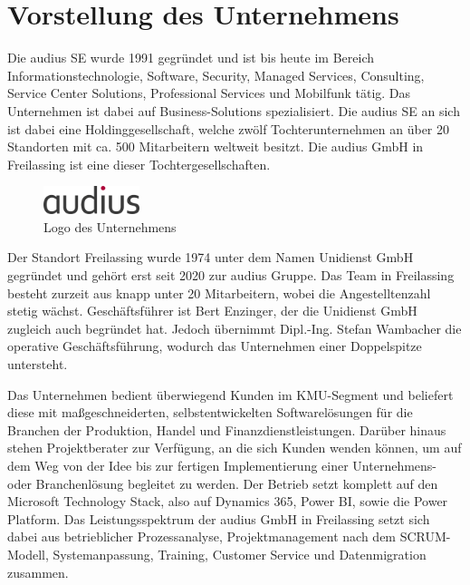 \section{Vorstellung des Unternehmens}
\label{sec:vorstellungunternehmen}

Die audius SE wurde 1991 gegründet und ist bis heute im Bereich Informationstechnologie, Software, Security, Managed Services, Consulting, Service Center Solutions, Professional Services und Mobilfunk tätig. Das Unternehmen ist dabei auf Business-Solutions spezialisiert. Die audius SE an sich ist dabei eine Holdinggesellschaft, welche zwölf Tochterunternehmen an über 20 Standorten mit ca. 500 Mitarbeitern weltweit besitzt. Die audius GmbH in Freilassing ist eine dieser Tochtergesellschaften.

\begin{figure}[h]
    \centering
    \includegraphics[width=0.25\textwidth]{img/audius_logo.png}
    \caption{Logo des Unternehmens}
\end{figure}

Der Standort Freilassing wurde 1974 unter dem Namen Unidienst GmbH gegründet und gehört erst seit 2020 zur audius Gruppe. Das Team in Freilassing besteht zurzeit aus knapp unter 20 Mitarbeitern, wobei die Angestelltenzahl stetig wächst. Geschäftsführer ist Bert Enzinger, der die Unidienst GmbH zugleich auch begründet hat. Jedoch übernimmt Dipl.-Ing. Stefan Wambacher die operative Geschäftsführung, wodurch das Unternehmen einer Doppelspitze untersteht.

Das Unternehmen bedient überwiegend Kunden im KMU-Segment und beliefert diese mit maßgeschneiderten, selbstentwickelten Softwarelösungen für die Branchen der Produktion, Handel und Finanzdienstleistungen. Darüber hinaus stehen Projektberater zur Verfügung, an die sich Kunden wenden können, um auf dem Weg von der Idee bis zur fertigen Implementierung einer Unternehmens- oder Branchenlösung begleitet zu werden. Der Betrieb setzt komplett auf den Microsoft Technology Stack, also auf Dynamics 365, Power BI, sowie die Power Platform. Das Leistungsspektrum der audius GmbH in Freilassing setzt sich dabei aus betrieblicher Prozessanalyse, Projektmanagement nach dem SCRUM-Modell, Systemanpassung, Training, Customer Service und Datenmigration zusammen.